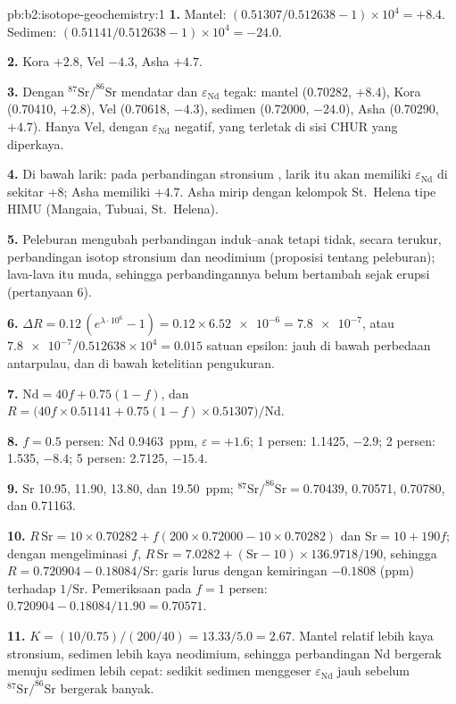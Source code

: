 \begin{solution}{pb:b2:isotope-geochemistry:1}
\textbf{1.} Mantel: $(0.51307/0.512638 - 1)\times10^4 = +8.4$. Sedimen:
$(0.51141/0.512638 - 1)\times10^4 = -24.0$.

\textbf{2.} Kora $+2.8$, Vel $-4.3$, Asha $+4.7$.

\textbf{3.} Dengan $^{87}\mathrm{Sr}/^{86}\mathrm{Sr}$ mendatar dan $\varepsilon_{\mathrm{Nd}}$ tegak:
mantel (0.70282, $+8.4$), Kora (0.70410, $+2.8$), Vel (0.70618, $-4.3$), sedimen
(0.72000, $-24.0$), Asha (0.70290, $+4.7$). Hanya Vel, dengan
$\varepsilon_{\mathrm{Nd}}$ negatif, yang terletak di sisi CHUR yang diperkaya.

\textbf{4.} Di bawah larik: pada perbandingan stronsium , larik itu
akan memiliki $\varepsilon_{\mathrm{Nd}}$ di sekitar $+8$; Asha memiliki $+4.7$. Asha mirip dengan
kelompok St.~Helena tipe HIMU (Mangaia, Tubuai, St.~Helena).

\textbf{5.} Peleburan mengubah perbandingan induk--anak tetapi tidak, secara terukur,
perbandingan isotop stronsium dan neodimium (proposisi tentang peleburan); lava-lava itu
muda, sehingga perbandingannya belum bertambah sejak erupsi (pertanyaan 6).

\textbf{6.} $\Delta R = 0.12\,(e^{\lambda\cdot10^6} - 1) = 0.12\times\num{6.52e-6} =
\num{7.8e-7}$, atau $\num{7.8e-7}/0.512638\times10^4 = 0.015$ satuan epsilon: jauh di bawah
perbedaan antarpulau, dan di bawah ketelitian pengukuran.

\textbf{7.} $\mathrm{Nd} = 40f + 0.75(1-f)$, dan
$R = \bigl(40f\times0.51141 + 0.75(1-f)\times0.51307\bigr)/\mathrm{Nd}$.

\textbf{8.} $f = 0.5$ persen: Nd \qty{0.9463}{ppm}, $\varepsilon = +1.6$; 1 persen:
1.1425, $-2.9$; 2 persen: 1.535, $-8.4$; 5 persen: 2.7125, $-15.4$.

\textbf{9.} Sr 10.95, 11.90, 13.80, dan \qty{19.50}{ppm}; $^{87}\mathrm{Sr}/^{86}\mathrm{Sr} =
0.70439$, 0.70571, 0.70780, dan 0.71163.

\textbf{10.} $R\,\mathrm{Sr} = 10\times0.70282 + f(200\times0.72000 - 10\times0.70282)$ dan
$\mathrm{Sr} = 10 + 190f$; dengan mengeliminasi $f$, $R\,\mathrm{Sr} = 7.0282 +
(\mathrm{Sr}-10)\times136.9718/190$, sehingga $R = 0.720904 - 0.18084/\mathrm{Sr}$: garis
lurus dengan kemiringan $-0.1808$ (ppm) terhadap $1/\mathrm{Sr}$. Pemeriksaan pada $f = 1$ persen:
$0.720904 - 0.18084/11.90 = 0.70571$.

\textbf{11.} $K = (10/0.75)/(200/40) = 13.33/5.0 = 2.67$. Mantel relatif
lebih kaya stronsium, sedimen lebih kaya neodimium, sehingga perbandingan Nd bergerak menuju
sedimen lebih cepat: sedikit sedimen menggeser $\varepsilon_{\mathrm{Nd}}$ jauh sebelum
$^{87}\mathrm{Sr}/^{86}\mathrm{Sr}$ bergerak banyak.


\end{solution}
